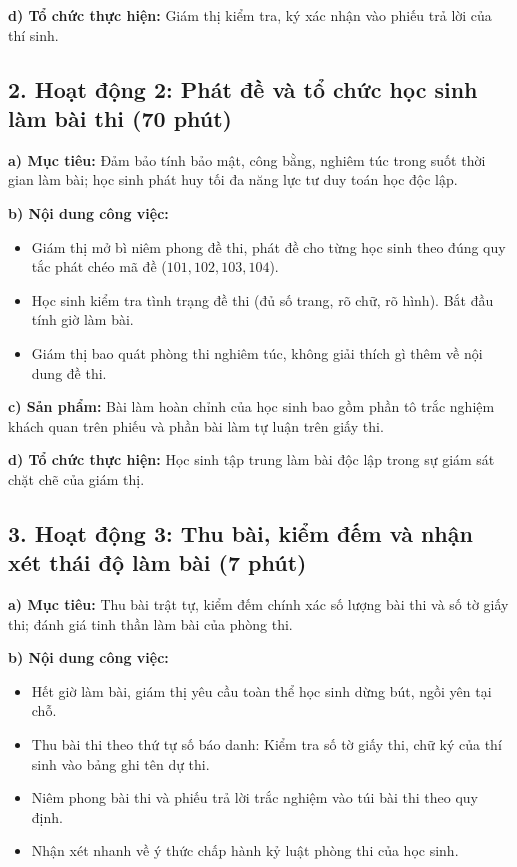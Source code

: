 \documentclass[12pt, a4paper]{article}
\begin{document}
\noindent \textbf{d) Tổ chức thực hiện:}
Giám thị kiểm tra, ký xác nhận vào phiếu trả lời của thí sinh.

\subsection*{2. Hoạt động 2: Phát đề và tổ chức học sinh làm bài thi (70 phút)}

\noindent \textbf{a) Mục tiêu:}
Đảm bảo tính bảo mật, công bằng, nghiêm túc trong suốt thời gian làm bài; học sinh phát huy tối đa năng lực tư duy toán học độc lập.

\noindent \textbf{b) Nội dung công việc:}
\begin{itemize}
    \item Giám thị mở bì niêm phong đề thi, phát đề cho từng học sinh theo đúng quy tắc phát chéo mã đề ($101, 102, 103, 104$).
    \item Học sinh kiểm tra tình trạng đề thi (đủ số trang, rõ chữ, rõ hình). Bắt đầu tính giờ làm bài.
    \item Giám thị bao quát phòng thi nghiêm túc, không giải thích gì thêm về nội dung đề thi.
\end{itemize}

\noindent \textbf{c) Sản phẩm:}
Bài làm hoàn chỉnh của học sinh bao gồm phần tô trắc nghiệm khách quan trên phiếu và phần bài làm tự luận trên giấy thi.

\noindent \textbf{d) Tổ chức thực hiện:}
Học sinh tập trung làm bài độc lập trong sự giám sát chặt chẽ của giám thị.

\subsection*{3. Hoạt động 3: Thu bài, kiểm đếm và nhận xét thái độ làm bài (7 phút)}

\noindent \textbf{a) Mục tiêu:}
Thu bài trật tự, kiểm đếm chính xác số lượng bài thi và số tờ giấy thi; đánh giá tinh thần làm bài của phòng thi.

\noindent \textbf{b) Nội dung công việc:}
\begin{itemize}
    \item Hết giờ làm bài, giám thị yêu cầu toàn thể học sinh dừng bút, ngồi yên tại chỗ.
    \item Thu bài thi theo thứ tự số báo danh: Kiểm tra số tờ giấy thi, chữ ký của thí sinh vào bảng ghi tên dự thi.
    \item Niêm phong bài thi và phiếu trả lời trắc nghiệm vào túi bài thi theo quy định.
    \item Nhận xét nhanh về ý thức chấp hành kỷ luật phòng thi của học sinh.
\end{itemize}
\end{document}
